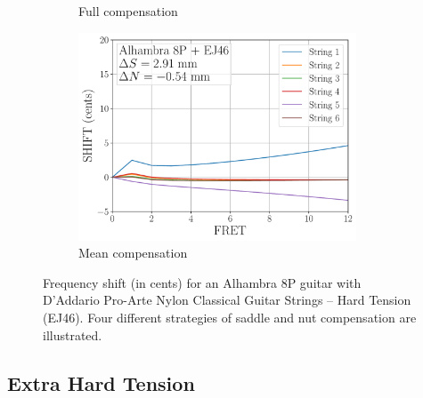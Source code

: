 \begin{figure}
\begin{subfigure}[b]{0.45\textwidth}
   \caption{Full compensation}
   \label{fig:shift_alhambra8p_ej46_full}
  \end{subfigure}
  \hspace{0.25in}
  \begin{subfigure}[b]{0.45\textwidth}
   \centering
   \includegraphics[width=3.25in]{figures/shift_alhambra8p_ej46_mean}
   \caption{Mean compensation}
   \label{fig:shift_alhambra8p_ej46_mean}
  \end{subfigure}
  \caption{\label{fig:compensation_alhambra8p_ej46} Frequency shift (in cents) for an Alhambra 8P guitar with D'Addario Pro-Arte Nylon Classical Guitar Strings -- Hard Tension (EJ46). Four different strategies of saddle and nut compensation are illustrated.}
 \end{figure}

 \newpage
 \subsection{Extra Hard Tension}


